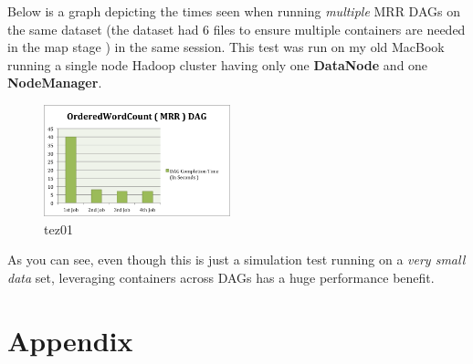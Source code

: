 \documentclass[twocolumn]{article}
\begin{document}
Below is a graph depicting the times seen when running \emph{multiple}
MRR DAGs on the same dataset (the dataset had 6 files to ensure multiple
containers are needed in the map stage ) in the same session. This test
was run on my old MacBook running a single node Hadoop cluster having
only one \textbf{DataNode} and one \textbf{NodeManager}.

\begin{figure}[htb]
        \centering
        \includegraphics[width=0.48\textwidth]{sessions-tez2}
        \caption{tez01}
        \label{fig18}
\end{figure}

As you can see, even though this is just a simulation test running on a
\emph{very small data} set, leveraging containers across DAGs has a huge
performance benefit.




\section*{Appendix}
\end{document}
